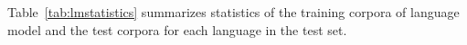 \newpage
{}
Table~\ref{tab:lmstatistics} summarizes statistics of the training
corpora of language model and the test corpora for each language in
the test set.  


